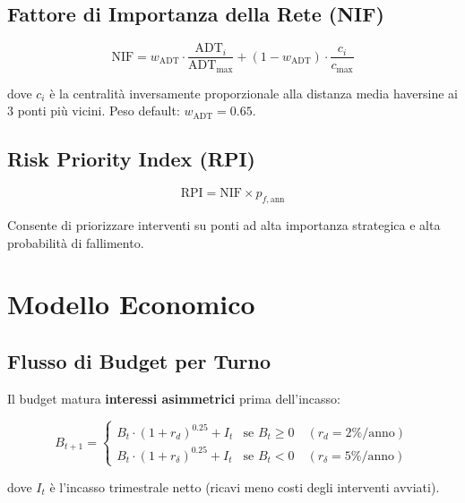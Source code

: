 \documentclass[11pt,a4paper]{article}
\begin{document}
\subsection{Fattore di Importanza della Rete (NIF)}

\begin{equation}
  \text{NIF} = w_{\text{ADT}} \cdot \frac{\text{ADT}_i}{\text{ADT}_{\max}}
              + (1 - w_{\text{ADT}}) \cdot \frac{c_i}{c_{\max}}
\end{equation}

dove $c_i$ \`e la centralit\`a inversamente proporzionale alla distanza media haversine ai 3 ponti pi\`u vicini. Peso default: $w_{\text{ADT}} = 0.65$.

\subsection{Risk Priority Index (RPI)}

\begin{equation}
  \text{RPI} = \text{NIF} \times p_{f,\text{ann}}
\end{equation}

Consente di priorizzare interventi su ponti ad alta importanza strategica e alta probabilit\`a di fallimento.

\section{Modello Economico}

\subsection{Flusso di Budget per Turno}

Il budget matura \textbf{interessi asimmetrici} prima dell'incasso:

\begin{equation}
  B_{t+1} = \begin{cases}
    B_t \cdot (1 + r_d)^{0.25} + I_t & \text{se } B_t \geq 0 \quad (r_d = 2\%\text{/anno}) \\
    B_t \cdot (1 + r_\delta)^{0.25} + I_t & \text{se } B_t < 0 \quad (r_\delta = 5\%\text{/anno})
  \end{cases}
\end{equation}

dove $I_t$ \`e l'incasso trimestrale netto (ricavi meno costi degli interventi avviati).
\end{document}

